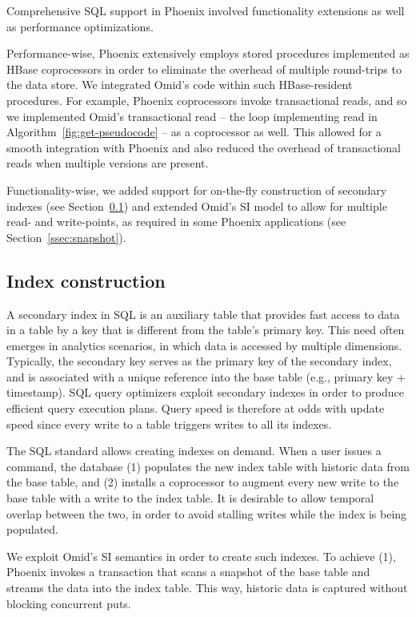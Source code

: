 

Comprehensive SQL support in Phoenix involved functionality extensions as well 
as performance optimizations. 

Performance-wise, 
Phoenix extensively employs stored procedures implemented as HBase coprocessors
in order to eliminate the overhead of multiple round-trips to the data store. 
We integrated Omid's code within such HBase-resident procedures.
For example, Phoenix coprocessors invoke transactional reads, and so we implemented Omid's 
transactional read -- the loop implementing read in Algorithm~\ref{fig:get-pseudocode} -- as a coprocessor as well. 
This allowed for a smooth integration  with Phoenix and also reduced the overhead of transactional
reads when multiple versions are present.

Functionality-wise, we added support for on-the-fly construction of secondary indexes
(see Section~\ref{ssec:indexes}) and extended 
Omid's SI model to allow for multiple read- and write-points, as required 
in some Phoenix applications (see Section~\ref{ssec:snapshot}). 

\subsection{Index construction}
\label{ssec:indexes}

A secondary index in SQL is an auxiliary table that provides fast access to data in a table 
by a key that is different from the table's primary key. This need often emerges in analytics scenarios, in
which data is accessed by multiple dimensions. Typically, the secondary key serves as the 
primary key of the secondary index, and is associated with a unique reference into the base table 
(e.g., primary key + timestamp). SQL query 
optimizers exploit secondary indexes in order to produce efficient query execution plans. Query speed 
is therefore at odds with update speed since every write to a table triggers writes to all its indexes. 

The SQL standard allows creating indexes on demand. When a user issues a {} 
command, the database (1) populates the new index table with historic data from the base table, and
(2) installs a coprocessor to augment every new write to the base table with a write to the index table. 
It is desirable to allow temporal overlap between the two, in order to avoid stalling  writes while 
the index is being populated. 

We exploit Omid's SI semantics in order to create such indexes. To achieve (1), 
Phoenix invokes a transaction that scans a snapshot of the base table and 
streams the data into the  index table. This way, historic data is captured without 
blocking concurrent puts. {}


